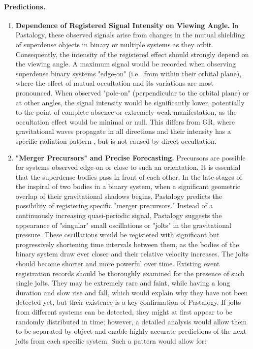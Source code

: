 \documentclass[pdflatex,sn-mathphys-num]{sn-jnl}
\begin{document}
\paragraph{Predictions.}
\begin{enumerate}
    \item \textbf{Dependence of Registered Signal Intensity on Viewing Angle.} In Pastalogy, these observed signals arise from changes in the mutual shielding of superdense objects in binary or multiple systems as they orbit. Consequently, the intensity of the registered effect should strongly depend on the viewing angle. A maximum signal would be recorded when observing superdense binary systems "edge-on" (i.e., from within their orbital plane), where the effect of mutual occultation and its variations are most pronounced. When observed "pole-on" (perpendicular to the orbital plane) or at other angles, the signal intensity would be significantly lower, potentially to the point of complete absence or extremely weak manifestation, as the occultation effect would be minimal or null. This differs from GR, where gravitational waves propagate in all directions and their intensity has a specific radiation pattern \cite{maggiore2007-gw}, but is not caused by direct occultation.
    \item \textbf{"Merger Precursors" and Precise Forecasting.} Precursors are possible for systems observed edge-on or close to such an orientation. It is essential that the superdense bodies pass in front of each other. In the late stages of the inspiral of two bodies in a binary system, when a significant geometric overlap of their gravitational shadows begins, Pastalogy predicts the possibility of registering specific "merger precursors." Instead of a continuously increasing quasi-periodic signal, Pastalogy suggests the appearance of "singular" small oscillations or "jolts" in the gravitational pressure. These oscillations would be registered with significant but progressively shortening time intervals between them, as the bodies of the binary system draw ever closer and their relative velocity increases. The jolts should become shorter and more powerful over time. Existing event registration records should be thoroughly examined for the presence of such single jolts. They may be extremely rare and faint, while having a long duration and slow rise and fall, which would explain why they have not been detected yet, but their existence is a key confirmation of Pastalogy. If jolts from different systems can be detected, they might at first appear to be randomly distributed in time; however, a detailed analysis would allow them to be separated by object and enable highly accurate predictions of the next jolts from each specific system. Such a pattern would allow for:

\end{enumerate}
\end{document}
